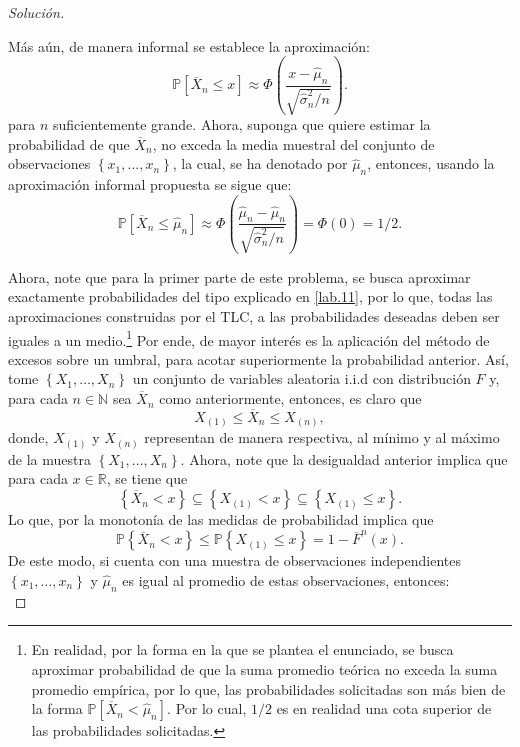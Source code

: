 \documentclass[10.5pt,notitlepage]{article}
\newenvironment{solucion}
  {\begin{proof}[Solución]}
  {\end{proof}}
\newcommand{\PP}{\mathbb{P}}
\newcommand{\RR}{\mathbb{R}}
\newcommand{\NN}{\mathbb{N}}
\newcommand{\corch}[1]{\left[ #1 \right]}
\newcommand{\kis}[1]{\left\{ #1 \right\}}
\newcommand{\pare}[1]{\left( #1 \right)}
\theoremstyle{plain}
\begin{document}
\begin{solucion}
\begin{itemize}
\begin{equation*}
    \end{equation*}
    Más aún, de manera informal se establece la aproximación:
    \[
     \PP\corch{\overline{X}_{n} \leq x} \approx \Phi\pare{\frac{x -  \hat{\mu}_{n}}{\sqrt{\hat{\sigma}_{n}^{2}/n}}}. 
    \]
    para \(n\) suficientemente grande. Ahora, suponga que quiere estimar la probabilidad de que \(\overline{X}_{n}\), no exceda la media muestral del conjunto de observaciones \(\kis{x_1, \hdots, x_n}\), la cual, se ha denotado por \(\hat{\mu}_{n}\), entonces, usando la aproximación informal propuesta se sigue que:
    \begin{equation}\label{lab.11}
    \PP\corch{\overline{X}_{n} \leq \hat{\mu}_{n}} \approx \Phi\pare{\frac{\hat{\mu}_{n} -  \hat{\mu}_{n}}{\sqrt{\hat{\sigma}_{n}^{2}/n}}} = \Phi(0) =1/2.        
    \end{equation}
\end{itemize}
Ahora, note que para la primer parte de este problema, se busca aproximar exactamente probabilidades del tipo explicado en \eqref{lab.11}, por lo que, todas las aproximaciones construidas por el TLC, a las probabilidades deseadas deben ser iguales a un medio.\footnote{En realidad, por la forma en la que se plantea el enunciado, se busca aproximar probabilidad de que la suma promedio teórica no exceda la suma promedio empírica, por lo que, las probabilidades solicitadas son más bien de la forma \(\PP[\overline{X}_{n} < \hat{\mu}_{n}]\). Por lo cual, \(1/2\) es en realidad una cota superior de las probabilidades solicitadas.} Por ende, de mayor interés es la aplicación del método de excesos sobre un umbral, para acotar superiormente la probabilidad anterior. Así, tome \(\kis{X_1, \hdots, X_{n}}\) un conjunto de variables aleatoria i.i.d con distribución \(F\) y, para cada \(n \in \NN\) sea \(\overline{X}_n\) como anteriormente, entonces, es claro que  
\[
  X_{(1)} \leq \overline{X}_n \leq X_{(n)},
\]
donde, \(X_{(1)}\) y \(X_{(n)}\) representan de manera respectiva, al mínimo y al máximo de la muestra \(\kis{X_1, \hdots, X_n}\). Ahora, note que la desigualdad anterior implica que para cada \(x \in \RR\), se tiene que 
\[
\kis{\overline{X}_n < x} \subseteq \kis{ X_{(1)}<x} \subseteq \kis{ X_{(1)} \leq x}.
\]
Lo que, por la monotonía de las medidas de probabilidad implica que
\[
\PP\kis{\overline{X}_n < x} \leq \PP\kis{ X_{(1)} \leq x} = 1- \overline{F}^{n}(x).
\]
De este modo, si cuenta con una muestra de observaciones independientes \(\kis{x_1, \hdots, x_n}\) y \(\hat{\mu}_{n}\) es igual al promedio de estas observaciones, entonces:
\begin{equation}\label{PHV}

\end{equation}
\end{solucion}
\end{document}
